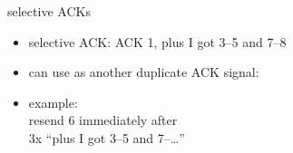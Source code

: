 \begin{frame}{selective ACKs}
    \begin{itemize}
    \item selective ACK: ACK 1, plus I got 3--5 and 7--8
    \item can use as another duplicate ACK signal:
    \item example: \\
        resend 6 immediately after \\
        3x ``plus I got 3--5 and 7--\ldots''
    \end{itemize}
\end{frame}
